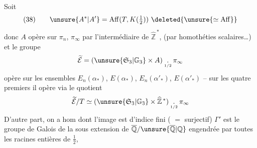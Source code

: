 Soit
\[
(38)\qquad\unsure{A^*|A'}=\operatorname{Aff}(T,K(\tfrac12))\
\deleted{\unsure{\simeq\operatorname{Aff}}}
\]
donc
$A$ opère sur $\pi_n$, $\pi_\infty$ 
par l'intermédiaire de $\widehat{\mathbb Z}^{\,*}$,
(par homothéties scalaires\ldots) et le groupe
\[
\widetilde{\mathcal E}=(\unsure{\mathfrak S_3|\mathbb G_3}\times A)
\mathbin{\underset{\scriptscriptstyle1/2}{.}}\pi_\infty
\]
opère  sur les ensembles
$E_n(\alpha_*)$, $E(\alpha_*)$, $E_n(\alpha'_*)$, $E(\alpha'_*)$
-- sur les quatre premiers il opère via le quotient
\[
\widetilde{\mathcal E}/T\simeq
(\unsure{\mathfrak S_3|\mathbb G_3}\times\widehat{\mathbb Z}^{\,*})
\mathbin{\underset{\scriptscriptstyle1/2}{.}}\pi_\infty
\]
D'autre part, on a
\diagram{\[
(40)\qquad\begin{tikzcd}[ampersand replacement=\&]\Gamma\arrow[r]\&A\end{tikzcd}
\]}
hom dont l'image  est d'indice fini
( $=$ surjectif) $\Gamma'$ est le groupe de Galois de la
sous extension de $\overline{\mathbb Q}/\unsure{\overline{\mathbb Q}|\mathbb Q}$
engendrée par toutes les racines entières de $\frac12$,
